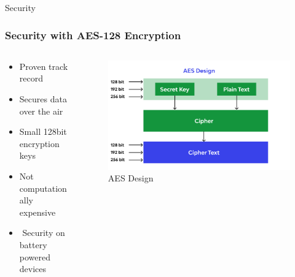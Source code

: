 \documentclass{beamer}
\begin{document}
\begin{frame}{Security}
  \frametitle{Security with AES-128 Encryption}
  \begin{columns}
    \begin{column}{0.5\textwidth}
      \begin{itemize}
        \item Proven track record
        \item Secures data over the air
        \item Small 128bit encryption keys
        \item Not computationally expensive
        \item \faThumbsOUp$ $ Security on battery powered devices
      \end{itemize}
    \end{column}
    \begin{column}{0.5\textwidth}
      \begin{figure}[htbp]
        \centering
        \includegraphics[width=\textwidth]{AES128_structure.png}
        \caption{AES Design \cite{Beschokov}}
        \label{fig:AES_Design}
      \end{figure}
    \end{column}
  \end{columns}
\end{frame}
\end{document}
